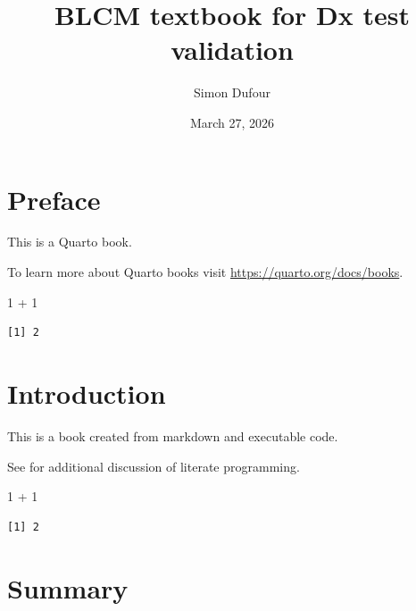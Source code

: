 \documentclass[
  letterpaper,
  DIV=11,
  numbers=noendperiod]{scrreprt}
\title{BLCM textbook for Dx test validation}
\author{Simon Dufour}
\date{March 27, 2026}
\newenvironment{Shaded}{\begin{snugshade}}{\end{snugshade}}
\newcommand{\DecValTok}[1]{\textcolor[rgb]{0.68,0.00,0.00}{#1}}
\newcommand{\SpecialCharTok}[1]{\textcolor[rgb]{0.37,0.37,0.37}{#1}}
\renewcommand*\contentsname{Table of contents}
\newcommand\contentsname{Table of contents}
\begin{document}
\maketitle

\renewcommand*\contentsname{Table of contents}
{
\hypersetup{linkcolor=}
\setcounter{tocdepth}{2}
\tableofcontents
}


\chapter*{Preface}\label{preface}


This is a Quarto book.

To learn more about Quarto books visit
\url{https://quarto.org/docs/books}.

\begin{Shaded}
\begin{Highlighting}[]
\DecValTok{1} \SpecialCharTok{+} \DecValTok{1}
\end{Highlighting}
\end{Shaded}

\begin{verbatim}
[1] 2
\end{verbatim}


\chapter{Introduction}\label{introduction}

This is a book created from markdown and executable code.

See \citet{knuth84} for additional discussion of literate programming.

\begin{Shaded}
\begin{Highlighting}[]
\DecValTok{1} \SpecialCharTok{+} \DecValTok{1}
\end{Highlighting}
\end{Shaded}

\begin{verbatim}
[1] 2
\end{verbatim}


\chapter{Summary}\label{summary}
\end{document}
